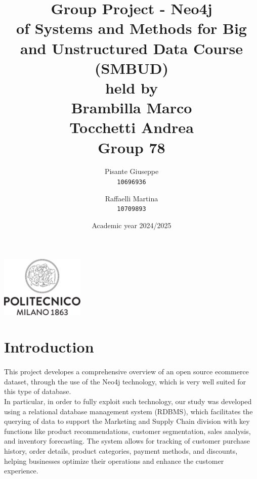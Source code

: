 \documentclass[a4paper,12pt]{article}
\begin{document}
\title{%
  Group Project - Neo4j \\
  \large of Systems and Methods for Big
    and Unstructured Data Course \\(SMBUD)\\
    held by\\ Brambilla Marco\\ Tocchetti Andrea \\
  \vspace{5mm}
  \Large \textbf{Group 78}}
\author{Pisante Giuseppe\\
  \texttt{10696936}
  \and
  Raffaelli Martina\\
  \texttt{10709893}
}
\date{Academic year 2024/2025}
\maketitle
\begin{center}
  \includegraphics[width=4cm]{polilogo.png}\\
\end{center}
\newpage
\tableofcontents
\newpage
\section{Introduction}
\paragraph{} This project developes a comprehensive overview of an open source ecommerce dataset, through the use of the Neo4j technology, which is very well suited for this type of database.
\\
In particular, in order to fully exploit such technology, our study was developed using a relational database management system (RDBMS), which facilitates the querying of data to support the Marketing and Supply Chain division with key functions like product recommendations, customer segmentation, sales analysis, and inventory forecasting. 
The system allows for tracking of customer purchase history, order details, product categories, payment methods, and discounts, helping businesses optimize their operations and enhance the customer experience.
\end{document}
